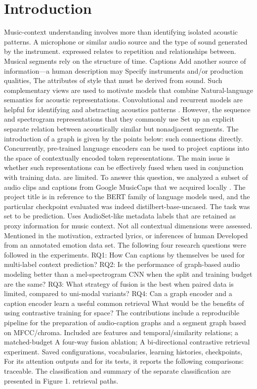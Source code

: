 \documentclass[10pt,twocolumn,letterpaper]{article}
\begin{document}
\section{Introduction}
Music-context understanding involves more than identifying isolated acoustic patterns. A microphone or similar audio source and the type of sound generated by the instrument. expressed relates to repetition and relationships between. Musical segments rely on the structure of time. Captions Add another source of information---a human description may Specify instruments and/or production qualities, The attributes of style that must be derived from sound. Such complementary views are used to motivate models that combine Natural-language semantics for acoustic representations. Convolutional and recurrent models are helpful for identifying and abstracting acoustics patterns \cite{choi2016crnn}. However, the sequence and spectrogram representations that they commonly use Set up an explicit separate relation between acoustically similar but nonadjacent segments. The introduction of a graph is given by the points below: such connections directly. Concurrently, pre-trained language encoders can be used to project captions into the space of contextually encoded token representations. The main issue is whether such representations can be effectively fused when used in conjunction with training data. are limited. To answer this question, we analyzed a subset of audio clips and captions from Google MusicCaps that we acquired locally \cite{agostinelli2023musiclm,googlemusiccaps}. The project title is in reference to the BERT family of language models used, and the particular checkpoint evaluated was indeed distilbert-base-uncased. The task was set to be prediction. Uses AudioSet-like metadata labels that are retained as proxy information for music context. Not all contextual dimensions were assessed. Mentioned in the motivation, extracted lyrics, or inferences of human Developed from an annotated emotion data set. The following four research questions were followed in the experiments. RQ1: How Can captions by themselves be used for multi-label context prediction? RQ2: Is the performance of graph-based audio modeling better than a mel-spectrogram CNN when the split and training budget are the same? RQ3: What strategy of fusion is the best when paired data is limited, compared to uni-modal variants? RQ4: Can a graph encoder and a caption encoder learn a useful common retrieval What would be the benefits of using contrastive training for space? The contributions include a reproducible pipeline for the preparation of audio-caption graphs and a segment graph based on MFCC/chroma. Included are features and temporal/similarity relations; a matched-budget A four-way fusion ablation; A bi-directional contrastive retrieval experiment. Saved configurations, vocabularies, learning histories, checkpoints, For its attention outputs and for its tests, it reports the following comparisons: traceable. The classification and summary of the separate classification are presented in Figure 1. retrieval paths.
\end{document}
